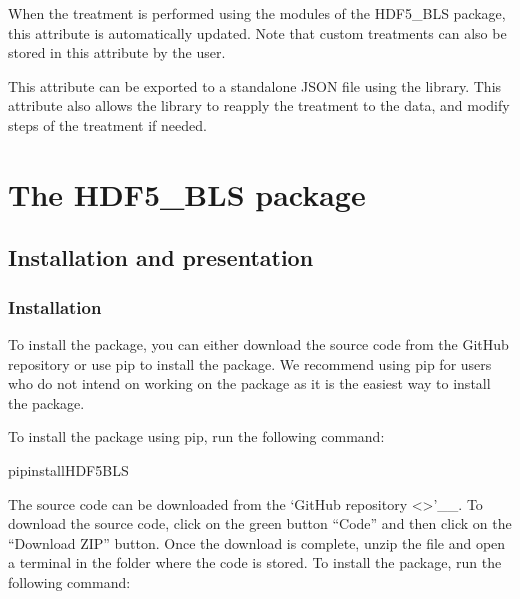 \documentclass[letterpaper,10pt,english]{sphinxmanual}
\begin{document}
\sphinxAtStartPar
When the treatment is performed using the modules of the HDF5\_BLS package, this attribute is automatically updated. Note that custom treatments can also be stored in this attribute by the user.

\sphinxAtStartPar
This attribute can be exported to a standalone JSON file using the library. This attribute also allows the library to re\sphinxhyphen{}apply the treatment to the data, and modify steps of the treatment if needed.

\sphinxstepscope


\section{The HDF5\_BLS package}
\label{\detokenize{source/hdf5_bls_package:the-hdf5-bls-package}}\label{\detokenize{source/hdf5_bls_package::doc}}

\subsection{Installation and presentation}
\label{\detokenize{source/hdf5_bls_package:installation-and-presentation}}

\subsubsection{Installation}
\label{\detokenize{source/hdf5_bls_package:installation}}
\sphinxAtStartPar
To install the package, you can either download the source code from the GitHub repository or use pip to install the package. We recommend using pip for users who do not intend on working on the package as it is the easiest way to install the package.

\sphinxAtStartPar
{}

\sphinxAtStartPar
To install the package using pip, run the following command:

\begin{sphinxVerbatim}[commandchars=\\\{\}]
pipinstallHDF5\PYGZus{}BLS
\end{sphinxVerbatim}

\sphinxAtStartPar
{}

\sphinxAtStartPar
The source code can be downloaded from the ‘GitHub repository \textless{}\textgreater{}’\_\_. To download the source code, click on the green button “Code” and then click on the “Download ZIP” button. Once the download is complete, unzip the file and open a terminal in the folder where the code is stored. To install the package, run the following command:
\end{document}
